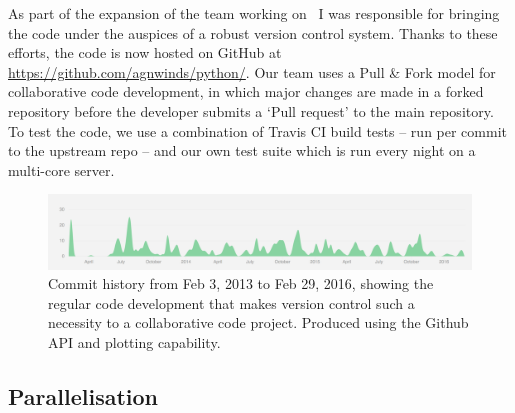 As part of the expansion of the team working on \py\, I was responsible
for bringing the code under the auspices of a robust version control system.
Thanks to these efforts, the code is now hosted on GitHub at 
\url{https://github.com/agnwinds/python/}. Our team uses a Pull \& Fork model
for collaborative code development, in which major changes are made in a 
forked repository before the developer submits a `Pull request' to the main 
repository. To test the code, we use a combination of Travis CI build tests 
-- run per commit to the upstream repo -- and our own test suite which is 
run every night on a multi-core server. 

\begin{figure}
\centering
\includegraphics[width=1.0\textwidth]{figures/03-radtrans/github1.png}
\caption
{
Commit history from Feb 3, 2013 to Feb 29, 2016, showing the regular code development
that makes version control such a necessity to a collaborative code project. Produced
using the Github API and plotting capability.
} 
\label{fig:github}
\end{figure}

\subsection{Parallelisation} 













